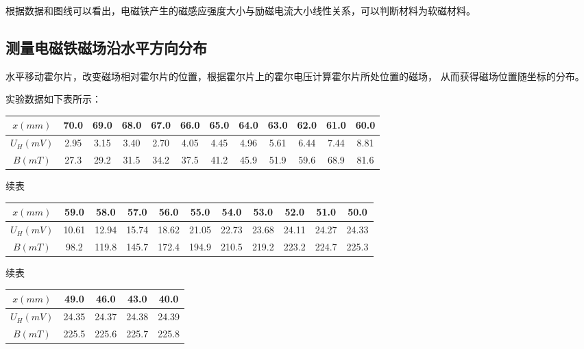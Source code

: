 \documentclass{article}
\begin{document}
    根据数据和图线可以看出，电磁铁产生的磁感应强度大小与励磁电流大小线性关系，可以判断材料为软磁材料。

    \subsection{测量电磁铁磁场沿水平方向分布}
    水平移动霍尔片，改变磁场相对霍尔片的位置，根据霍尔片上的霍尔电压计算霍尔片所处位置的磁场，
    从而获得磁场位置随坐标的分布。

    实验数据如下表所示：

    \vspace{1ex}
    \begin{tabular}{|c|c|c|c|c|c|c|c|c|c|c|c|}
        \hline
        $x(mm)$ & 70.0 & 69.0 & 68.0 & 67.0 & 66.0 & 65.0 & 64.0 & 63.0 & 62.0 & 61.0 & 60.0\\
        \hline
        $U_H(mV)$ & 2.95 & 3.15 & 3.40 & 2.70 & 4.05 & 4.45 & 4.96 & 5.61 & 6.44  & 7.44 & 8.81\\
        \hline
        $B(mT)$ & 27.3 & 29.2 & 31.5 & 34.2 & 37.5 & 41.2 & 45.9 & 51.9 & 59.6  & 68.9 & 81.6\\
        \hline
    \end{tabular}
    \vspace{1ex}

    \newpage
    续表

    \vspace{1ex}
    \begin{tabular}{|c|c|c|c|c|c|c|c|c|c|c|}
        \hline
        $x(mm)$ & 59.0 & 58.0 & 57.0 & 56.0 & 55.0 & 54.0 & 53.0 & 52.0 & 51.0 & 50.0\\
        \hline
        $U_H(mV)$ & 10.61 & 12.94 & 15.74 & 18.62 & 21.05 & 22.73 & 23.68 & 24.11 & 24.27 & 24.33\\
        \hline
        $B(mT)$ & 98.2 & 119.8 & 145.7 & 172.4 & 194.9 & 210.5 & 219.2 & 223.2 & 224.7 & 225.3\\
        \hline
    \end{tabular}
    \vspace{1ex}

    续表

    \vspace{1ex}
    \begin{tabular}{|c|c|c|c|c|}
        \hline
        $x(mm)$ & 49.0 & 46.0 & 43.0 & 40.0 \\
        \hline
        $U_H(mV)$ & 24.35 & 24.37 & 24.38 & 24.39 \\
        \hline
        $B(mT)$ & 225.5 & 225.6 & 225.7 & 225.8 \\
        \hline
    \end{tabular}
    \vspace{1ex}
\end{document}
